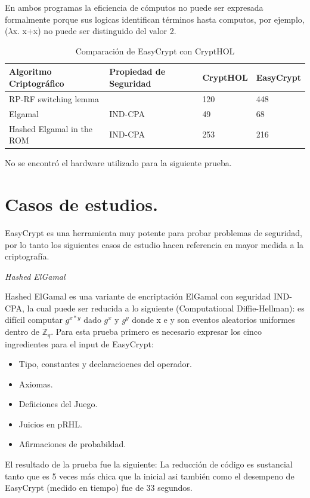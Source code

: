 \documentclass[runningheads,a4paper]{llncs}
\begin{document}
En ambos programas la eficiencia de cómputos no puede ser expresada formalmente porque sus logicas identifican términos hasta computos, por ejemplo, ($\lambda$x. x+x) no puede ser distinguido del valor 2.\cite{article6}

\begin{table}
  \caption{Comparación de EasyCrypt con CryptHOL}
  \label{tab:simple2}
  \centering
  \begin{tabular}{ |p{4cm}|p{4cm}|p{2cm}|p{2cm}|  }
 \hline
 Algoritmo Criptográfico & Propiedad de Seguridad & CryptHOL & EasyCrypt\\\cline{1-4}
 \hline
 RP-RF switching lemma &  & 120 & 448\\
 Elgamal & IND-CPA & 49  & 68\\
 Hashed Elgamal in the ROM & IND-CPA & 253 &  216\\
 \hline
\end{tabular}
\end{table}


No se encontró el hardware utilizado para la siguiente prueba.




\section{Casos de estudios.}
EasyCrypt es una herramienta muy potente para probar problemas de seguridad, por lo tanto los siguientes casos de estudio hacen referencia en mayor medida a la criptografía.


\centerline{\emph{Hashed ElGamal}}


Hashed ElGamal es una variante de encriptación ElGamal con seguridad IND-CPA, la cual puede ser reducida a lo siguiente (Computational Diffie-Hellman): es difícil computar $g^{x*y}$ dado $g^x$ y $g^y$ donde x e y son eventos aleatorios uniformes dentro de $\mathbb{Z}_q$.
Para esta prueba primero es necesario expresar los cinco ingredientes para el input de EasyCrypt:
\begin{itemize}
	\item Tipo, constantes y declaracioenes del operador.
	\item Axiomas.
	\item Defiiciones del Juego.
	\item Juicios en pRHL.
	\item Afirmaciones de probabildad.
\end{itemize}

El resultado de la prueba fue la siguiente: La reducción de código es sustancial tanto que es 5 veces más chica que la inicial asi también como el desempeno de EasyCrypt (medido en tiempo) fue de 33 segundos.\cite{article3}
\end{document}

